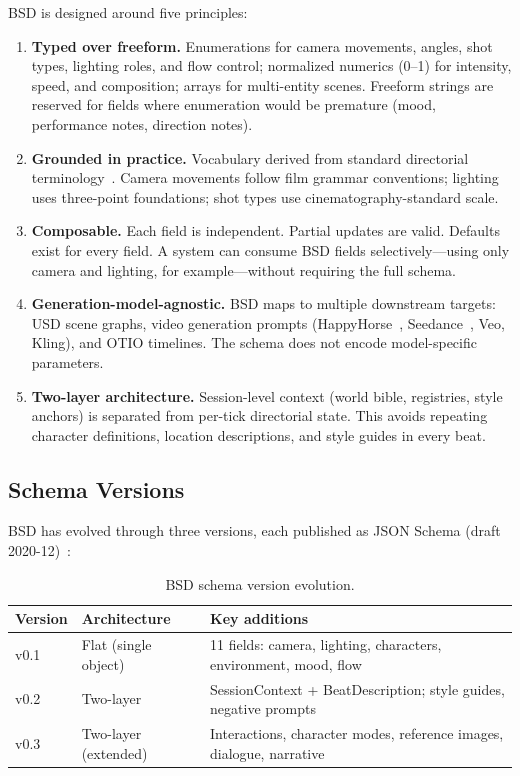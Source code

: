 \documentclass{article}
\begin{document}
BSD is designed around five principles:

\begin{enumerate}
  \item \textbf{Typed over freeform.} Enumerations for camera movements, angles, shot types, lighting roles, and flow control; normalized numerics (0--1) for intensity, speed, and composition; arrays for multi-entity scenes. Freeform strings are reserved for fields where enumeration would be premature (mood, performance notes, direction notes).
  \item \textbf{Grounded in practice.} Vocabulary derived from standard directorial terminology~\cite{katz2019,brown2016,mascelli1965}. Camera movements follow film grammar conventions; lighting uses three-point foundations; shot types use cinematography-standard scale.
  \item \textbf{Composable.} Each field is independent. Partial updates are valid. Defaults exist for every field. A system can consume BSD fields selectively---using only camera and lighting, for example---without requiring the full schema.
  \item \textbf{Generation-model-agnostic.} BSD maps to multiple downstream targets: USD scene graphs, video generation prompts (HappyHorse~\cite{happyhorse2026}, Seedance~\cite{seedance2026}, Veo, Kling), and OTIO timelines. The schema does not encode model-specific parameters.
  \item \textbf{Two-layer architecture.} Session-level context (world bible, registries, style anchors) is separated from per-tick directorial state. This avoids repeating character definitions, location descriptions, and style guides in every beat.
\end{enumerate}

\subsection{Schema Versions}

BSD has evolved through three versions, each published as JSON Schema (draft 2020-12)~\cite{jsonschema2020}:

\begin{table}[H]
\centering
\begin{tabular}{@{}lll@{}}
\toprule
\textbf{Version} & \textbf{Architecture} & \textbf{Key additions} \\
\midrule
v0.1 & Flat (single object) & 11 fields: camera, lighting, characters, environment, mood, flow \\
v0.2 & Two-layer & SessionContext + BeatDescription; style guides, negative prompts \\
v0.3 & Two-layer (extended) & Interactions, character modes, reference images, dialogue, narrative \\
\bottomrule
\end{tabular}
\caption{BSD schema version evolution.}
\label{tab:versions}
\end{table}
\end{document}

